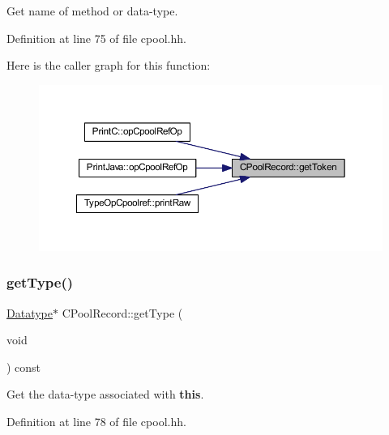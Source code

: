 Get name of method or data-\/type. 



Definition at line 75 of file cpool.\+hh.

Here is the caller graph for this function\+:
\nopagebreak
\begin{figure}[H]
\begin{center}
\leavevmode
\includegraphics[width=350pt]{class_c_pool_record_a7b76b5b4547e4cedc60b79e635fda432_icgraph}
\end{center}
\end{figure}
\mbox{\label{class_c_pool_record_ad6af01c246cf40ac83fb54fe7df981dd}} 
\subsubsection{\texorpdfstring{getType()}{getType()}}
{\footnotesize\ttfamily \mbox{\hyperlink{class_datatype}{Datatype}}$\ast$ C\+Pool\+Record\+::get\+Type (\begin{DoxyParamCaption}\item[{void}]{ }\end{DoxyParamCaption}) const\hspace{0.3cm}{\ttfamily [inline]}}



Get the data-\/type associated with {\bfseries{this}}. 



Definition at line 78 of file cpool.\+hh.

